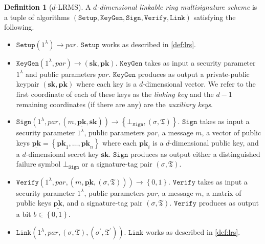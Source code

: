 \documentclass{mrl}
\theoremstyle{plain}
\theoremstyle{definition}
\newtheorem{defn}{Definition}[section]
\begin{document}
\begin{defn}[$d$-LRMS]
A \textit{$d$-dimensional linkable ring multisignature scheme} is a tuple of algorithms $(\texttt{Setup}, \texttt{KeyGen}, \texttt{Sign}, \texttt{Verify}, \texttt{Link})$ satisfying the following. 
\begin{itemize}
\item $\texttt{Setup}(1^\lambda) \to \textit{par}$. $\texttt{Setup}$ works as described in \ref{def:lrs}. 

\item $\texttt{KeyGen}(1^\lambda, \textit{par}) \to (\textbf{sk}, \textbf{pk})$. $\texttt{KeyGen}$ takes as input a security parameter $1^\lambda$ and public parameters $\textit{par}$. $\texttt{KeyGen}$ produces as output a private-public keypair $(\textbf{sk}, \textbf{pk})$ where each key is a $d$-dimensional vector. We refer to the first coordinate of each of these keys as the \textit{linking key} and the $d-1$ remaining coordinates (if there are any) are the \textit{auxiliary keys}.

\item $\texttt{Sign}\left(1^\lambda, \textit{par}, (m, \underline{\textbf{pk}}, \textbf{sk})\right) \to \left\{\bot_{\texttt{Sign}}, (\sigma, \mathfrak{T})\right\}$. $\texttt{Sign}$ takes as input a security parameter $1^\lambda$, public parameters $\textit{par}$, a message $m$, a vector of public keys $\underline{\textbf{pk}} = \left\{\textbf{pk}_1, \ldots, \textbf{pk}_n\right\}$ where each $\textbf{pk}_i$ is a $d$-dimensional public key, and a $d$-dimensional secret key $\textbf{sk}$. $\texttt{Sign}$ produces as output either a distinguished failure symbol $\bot_{\texttt{Sign}}$ or a signature-tag pair $(\sigma, \mathfrak{T})$. 

\item $\texttt{Verify}\left(1^\lambda, \textit{par}, (m, \underline{\textbf{pk}}, (\sigma, \mathfrak{T}))\right) \rightarrow \left\{0,1\right\}$. $\texttt{Verify}$ takes as input a security parameter $1^\lambda$, public parameters $\textit{par}$, a message $m$, a matrix of public keys $\underline{\textbf{pk}}$, and a signature-tag pair $(\sigma, \mathfrak{T})$. $\texttt{Verify}$ produces as output a bit $b \in \left\{0,1\right\}$. 

\item  $\texttt{Link}\left(1^\lambda, \textit{par}, (\sigma, \mathfrak{T}), (\sigma^\prime, \mathfrak{T}^\prime)\right)$. $\texttt{Link}$ works as described in \ref{def:lrs}.
\end{itemize}
\end{defn}
\end{document}
